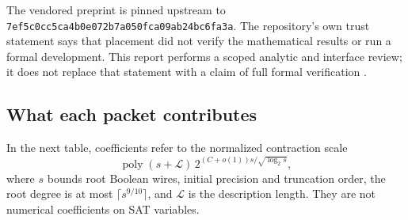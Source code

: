\documentclass[11pt,letterpaper]{article}
\theoremstyle{definition}\newtheorem{definition}[theorem]{Definition}
\theoremstyle{remark}\newtheorem{remark}[theorem]{Remark}
\newcommand{\poly}{\operatorname{poly}}
\begin{document}
The vendored preprint is pinned upstream to
\nolinkurl{7ef5c0cc5ca4b0e072b7a050fca09ab24bc6fa3a}.
The repository's own trust statement says that placement did not verify
the mathematical results or run a formal development. This report performs
a scoped analytic and interface review; it does not replace that statement
with a claim of full formal verification \cite{index,placement,preprint}.

\subsection{What each packet contributes}
In the next table, coefficients refer to the normalized contraction scale
\begin{equation}\label{eq:normalization}
 \poly(s+\mathcal L)\,2^{(C+o(1))s/\sqrt{\log_2s}},
\end{equation}
where $s$ bounds root Boolean wires, initial precision and truncation order,
the root degree is at most $\lceil s^{9/10}\rceil$, and $\mathcal L$ is the
description length. They are not numerical coefficients on SAT variables.
\end{document}
